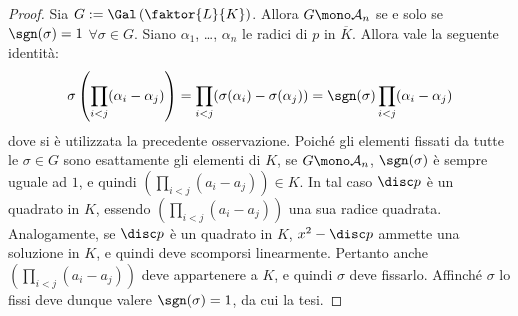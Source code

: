 \documentclass[11pt]{scrartcl}
\begin{document}
	\begin{proof}
		Sia $G := \Gal\left(\faktor{L}{K}\right)$. Allora $G \mono \mathcal{A}_n$ se e solo se
		$\sgn(\sigma) = 1$ $\forall \sigma \in G$. Siano $\alpha_1$, \ldots, $\alpha_n$ le
		radici di $p$ in $\overline{K}$. Allora vale la seguente identità:
		\[ \sigma\left(\prod_{i < j} (\alpha_i - \alpha_j)\right) = \prod_{i < j} (\sigma(\alpha_i) - \sigma(\alpha_j)) = \sgn(\sigma) \prod_{i < j} (\alpha_i - \alpha_j) \]
		dove si è utilizzata la precedente osservazione.
		Poiché gli elementi fissati da tutte le $\sigma \in G$ sono esattamente gli
		elementi di $K$, se $G \mono \mathcal{A}_n$, $\sgn(\sigma)$ è sempre uguale ad $1$, e quindi
		$\left(\prod_{i < j} (a_i - a_j)\right) \in K$. In tal caso $\disc p$ è un
		quadrato in $K$, essendo $\left(\prod_{i < j} (a_i - a_j)\right)$ una sua
		radice quadrata. Analogamente, se $\disc p$ è un quadrato in $K$,
		$x^2 - \disc p$ ammette una soluzione in $K$, e quindi deve scomporsi linearmente.
		Pertanto anche
		$\left(\prod_{i < j} (a_i - a_j)\right)$ deve appartenere a $K$, e quindi
		$\sigma$ deve fissarlo. Affinché $\sigma$ lo fissi deve dunque valere
		$\sgn(\sigma) = 1$, da cui la tesi.
	\end{proof}
	
\end{document}

